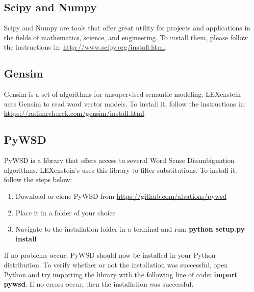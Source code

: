 \subsection{Scipy and Numpy}

Scipy and Numpy \cite{scipy} are tools that offer great utility for projects and applications in the fields of mathematics, science, and engineering. To install them, please follow the instructions in: \url{http://www.scipy.org/install.html}.







\subsection{Gensim}

Gensim \cite{gensim} is a set of algorithms for unsupervised semantic modeling. LEXenstein uses Gensim to read word vector models. To install it, follow the instructions in: \url{https://radimrehurek.com/gensim/install.html}.







\subsection{PyWSD}

PyWSD \cite{pywsd} is a library that offers access to several Word Sense Disambiguation algorithms. LEXenstein's uses this library to filter substitutions. To install it, follow the steps below:

\begin{enumerate}
	\item Download or clone PyWSD from \url{https://github.com/alvations/pywsd}
	\item Place it in a folder of your choice
	\item Navigate to the installation folder in a terminal and run: \textbf{python setup.py install}
\end{enumerate}

If no problems occur, PyWSD should now be installed in your Python distribution. To verify whether or not the installation was successful, open Python and try importing the library with the following line of code: \textbf{import pywsd}. If no errors occur, then the installation was successful.






